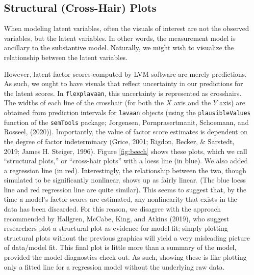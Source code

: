 \documentclass[
  english,
  man]{apa6}
\begin{document}
\hypertarget{structural-cross-hair-plots}{%
\subsection{Structural (Cross-Hair) Plots}\label{structural-cross-hair-plots}}

When modeling latent variables, often the visuals of interest are not the observed variables, but the latent variables. In other words, the measurement model is ancillary to the substantive model. Naturally, we might wish to visualize the relationship between the latent variables.

However, latent factor scores computed by LVM software are merely predictions. As such, we ought to have visuals that reflect uncertainty in our predictions for the latent scores. In \texttt{flexplavaan}, this uncertainty is represented as crosshairs. The widths of each line of the crosshair (for both the \(X\) axis and the \(Y\) axis) are obtained from prediction intervals for \texttt{lavaan} objects (using the \texttt{plausibleValues} function of the \texttt{semTools} package; Jorgensen, Pornprasertmanit, Schoemann, and Rosseel, (2020)). Importantly, the value of factor score estimates is dependent on the degree of factor indeterminacy (Grice, 2001; Rigdon, Becker, \& Sarstedt, 2019; James H. Steiger, 1996). Figure \ref{fig:beech} shows these plots, which we call ``structural plots,'' or ``cross-hair plots'' with a loess line (in blue). We also added a regression line (in red). Interestingly, the relationship between the two, though simulated to be significantly nonlinear, shows up as fairly linear. (The blue loess line and red regression line are quite similar). This seems to suggest that, by the time a model's factor scores are estimated, any nonlinearity that exists in the data has been discarded. For this reason, we disagree with the approach recommended by Hallgren, McCabe, King, and Atkins (2019), who suggest researchers plot a structural plot as evidence for model fit; simply plotting structural plots without the previous graphics will yield a very misleading picture of data/model fit. This final plot is little more than a summary of the model, provided the model diagnostics check out. As such, showing these is like plotting only a fitted line for a regression model without the underlying raw data.
\end{document}
